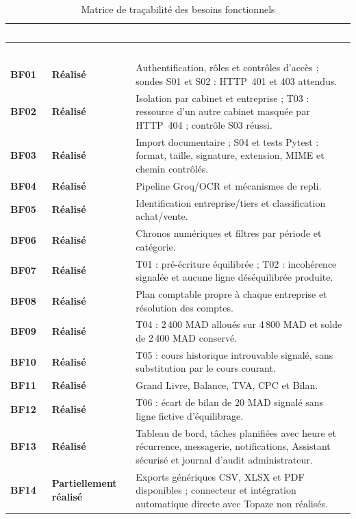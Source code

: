 \documentclass[12pt,a4paper,oneside]{report}
\newcommand{\TableSetup}{%
  \arrayrulecolor{ComptaTableLine}%
  \setlength{\arrayrulewidth}{0.45pt}%
  \renewcommand{\arraystretch}{1.18}%
}
\newcommand{\TableHead}[1]{\textcolor{white}{\textbf{#1}}}
\newcommand{\TableId}[1]{\textcolor{ComptaGreen}{\textbf{#1}}}
\newcommand{\TableSuccess}[1]{\textcolor{ComptaGreen}{\textbf{#1}}}
\begin{document}
\small
\TableSetup
\begin{longtable}{|L{1.6cm}|L{3cm}|L{9.8cm}|}
\caption{Matrice de traçabilité des besoins fonctionnels}\label{tab:tracabilite-bf}\\
\toprule
{}\TableHead{Besoin} & \TableHead{État} & \TableHead{Preuve / validation} \\
\midrule
\endfirsthead
\toprule
{}\TableHead{Besoin} & \TableHead{État} & \TableHead{Preuve / validation} \\
\midrule
\endhead
\TableId{BF01} & \TableSuccess{Réalisé} & Authentification, rôles et contrôles d'accès ; sondes S01 et S02 : HTTP~401 et 403 attendus. \\
\TableId{BF02} & \TableSuccess{Réalisé} & Isolation par cabinet et entreprise ; T03 : ressource d'un autre cabinet masquée par HTTP~404 ; contrôle S03 réussi. \\
\TableId{BF03} & \TableSuccess{Réalisé} & Import documentaire ; S04 et tests Pytest : format, taille, signature, extension, MIME et chemin contrôlés. \\
\TableId{BF04} & \TableSuccess{Réalisé} & Pipeline Groq/OCR et mécanismes de repli. \\
\TableId{BF05} & \TableSuccess{Réalisé} & Identification entreprise/tiers et classification achat/vente. \\
\TableId{BF06} & \TableSuccess{Réalisé} & Chronos numériques et filtres par période et catégorie. \\
\TableId{BF07} & \TableSuccess{Réalisé} & T01 : pré-écriture équilibrée ; T02 : incohérence signalée et aucune ligne déséquilibrée produite. \\
\TableId{BF08} & \TableSuccess{Réalisé} & Plan comptable propre à chaque entreprise et résolution des comptes. \\
\TableId{BF09} & \TableSuccess{Réalisé} & T04 : 2\,400 MAD alloués sur 4\,800 MAD et solde de 2\,400 MAD conservé. \\
\TableId{BF10} & \TableSuccess{Réalisé} & T05 : cours historique introuvable signalé, sans substitution par le cours courant. \\
\TableId{BF11} & \TableSuccess{Réalisé} & Grand Livre, Balance, TVA, CPC et Bilan. \\
\TableId{BF12} & \TableSuccess{Réalisé} & T06 : écart de bilan de 20 MAD signalé sans ligne fictive d'équilibrage. \\
\TableId{BF13} & \TableSuccess{Réalisé} & Tableau de bord, tâches planifiées avec heure et récurrence, messagerie, notifications, Assistant sécurisé et journal d'audit administrateur. \\
\TableId{BF14} & \textcolor{ComptaSlate}{\textbf{Partiellement réalisé}} & Exports génériques CSV, XLSX et PDF disponibles ; connecteur et intégration automatique directe avec Topaze non réalisés. \\
\bottomrule
\end{longtable}
\normalsize
\end{document}
